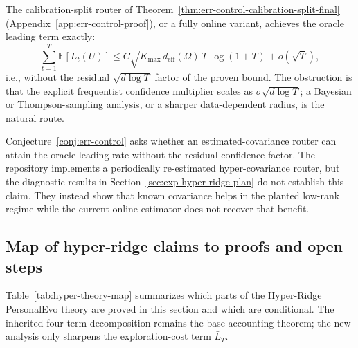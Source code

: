 \documentclass{article} %
\begin{document}
\begin{conjecture}
\label{conj:err-control}
The calibration-split router of Theorem~\ref{thm:err-control-calibration-split-final} (Appendix~\ref{app:err-control-proof}), or a fully online variant, achieves the oracle leading term exactly:
\begin{equation}
\label{eq:hyper-conj-err}
\sum_{t=1}^{T}\mathbb{E}[L_t(U)]
\le C\sqrt{K_{\max}\,d_{\mathrm{eff}}(\Omega)\,T\,\log(1+T)}
+ o(\sqrt{T}),
\end{equation}
i.e., without the residual $\sqrt{d\log T}$ factor of the proven bound. The obstruction is that the explicit frequentist confidence multiplier scales as $\sigma\sqrt{d\log T}$; a Bayesian or Thompson-sampling analysis, or a sharper data-dependent radius, is the natural route.
\end{conjecture}

Conjecture~\ref{conj:err-control} asks whether an estimated-covariance router can attain the oracle leading rate without the residual confidence factor. The repository implements a periodically re-estimated hyper-covariance router, but the diagnostic results in Section~\ref{sec:exp-hyper-ridge-plan} do not establish this claim. They instead show that known covariance helps in the planted low-rank regime while the current online estimator does not recover that benefit.

\subsection{Map of hyper-ridge claims to proofs and open steps}
\label{sec:theory-hyper-map}

Table~\ref{tab:hyper-theory-map} summarizes which parts of the Hyper-Ridge PersonalEvo theory are proved in this section and which are conditional.  The inherited four-term decomposition remains the base accounting theorem; the new analysis only sharpens the exploration-cost term \(\bar L_T\).
\end{document}
